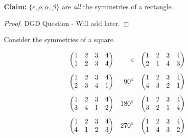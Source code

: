 \documentclass[openany]{report}
\begin{document}
\textbf{Claim:} $\{\epsilon, \rho, \alpha, \beta\}$ are \emph{all} the symmetries of a rectangle.
\begin{proof}
    DGD Question - Will add later.
\end{proof}
\noindent
Consider the symmetries of a square.
\begin{center}
\end{center}
\begin{align*}
    \begin{pmatrix}
        1 & 2 & 3 & 4\\
        1 & 2 & 3 & 4
    \end{pmatrix} && \epsilon
    && \begin{pmatrix}
        1 & 2 & 3 & 4\\
        2 & 1 & 4 & 3
    \end{pmatrix} \\[1ex]
    \begin{pmatrix}
        1 & 2 & 3 & 4\\
        2 & 3 & 4 & 1
    \end{pmatrix} && 90\degree 
    &&\begin{pmatrix}
        1 & 2 & 3 & 4\\
        4 & 3 & 2 & 1
    \end{pmatrix}\\[1ex]
    \begin{pmatrix}
        1 & 2 & 3 & 4\\
        3 & 4 & 1 & 2
    \end{pmatrix}&& 180\degree
    && \begin{pmatrix}
        1 & 2 & 3 & 4\\
        3 & 2 & 1 & 4
    \end{pmatrix}\\[1ex]
    \begin{pmatrix}
        1 & 2 & 3 & 4\\
        4 & 1 & 2 & 3
    \end{pmatrix}&& 270\degree
    &&\begin{pmatrix}
        1 & 2 & 3 & 4\\
        1 & 4 & 3 & 2
    \end{pmatrix}
\end{align*}
\end{document}
